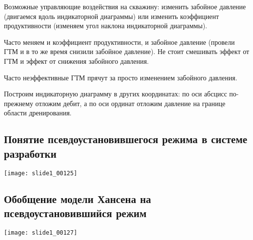 \documentclass[main.tex]{subfiles}
\begin{document}
Возможные управляющие воздействия на скважину: изменить забойное давление (двигаемся вдоль индикаторной диаграммы) или изменить коэффициент продуктивности (изменяем угол наклона индикаторной диаграммы).

Часто меняем и коэффициент продуктивности, и забойное давление (провели ГТМ и в то же время снизили забойное давление). Не стоит смешивать эффект от ГТМ и эффект от снижения забойного давления.

Часто неэффективные ГТМ прячут за просто изменением забойного давления.


Построим индикаторную диаграмму в других координатах: по оси абсцисс по-прежнему отложим дебит, а по оси ординат отложим давление на границе области дренирования.









\subsection{Понятие псевдоустановившегося режима в системе разработки}

\texttt{[image: slide1\_00125]}


\subsection{Обобщение модели Хансена на псевдоустановившийся режим}

\texttt{[image: slide1\_00127]}








\end{document}
